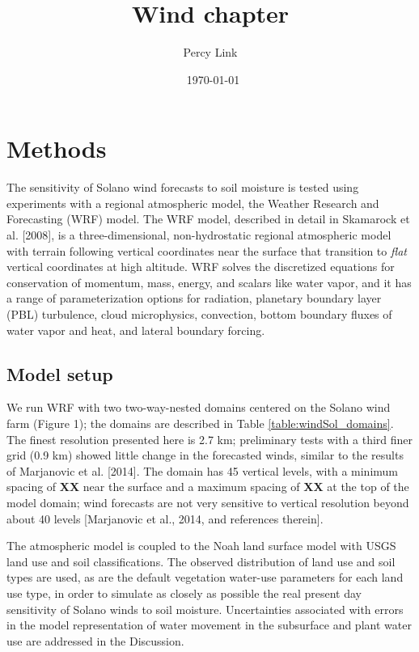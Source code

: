 \documentclass[12pt]{amsart}
\title{Wind chapter}
\author{Percy Link}
\date{\currenttime \ \today} %
\begin{document}
\maketitle

\section{Methods}

The sensitivity of Solano wind forecasts to soil moisture is tested using experiments with a regional atmospheric model, the Weather Research and Forecasting (WRF) model.  The WRF model, described in detail in Skamarock et al. [2008], is a three-dimensional, non-hydrostatic regional atmospheric model with terrain following vertical coordinates near the surface that transition to \textit{flat} vertical coordinates at high altitude.  WRF solves the discretized equations for conservation of momentum, mass, energy, and scalars like water vapor, and it has a range of parameterization options for radiation, planetary boundary layer (PBL) turbulence, cloud microphysics, convection, bottom boundary fluxes of water vapor and heat, and lateral boundary forcing.

\subsection{Model setup}

We run WRF with two two-way-nested domains centered on the Solano wind farm (Figure 1); the domains are described in Table \ref{table:windSol_domains}.  The finest resolution presented here is 2.7 km; preliminary tests with a third finer grid (0.9 km) showed little change in the forecasted winds, similar to the results of Marjanovic et al. [2014].  The domain has 45 vertical levels, with a minimum spacing of \textbf{XX} near the surface and a maximum spacing of \textbf{XX} at the top of the model domain; wind forecasts are not very sensitive to vertical resolution beyond about 40 levels [Marjanovic et al., 2014, and references therein].

The atmospheric model is coupled to the Noah land surface model with USGS land use and soil classifications.  The observed distribution of land use and soil types are used, as are the default vegetation water-use parameters for each land use type, in order to simulate as closely as possible the real present day sensitivity of Solano winds to soil moisture.  Uncertainties associated with errors in the model representation of water movement in the subsurface and plant water use are addressed in the Discussion. 
\end{document}
